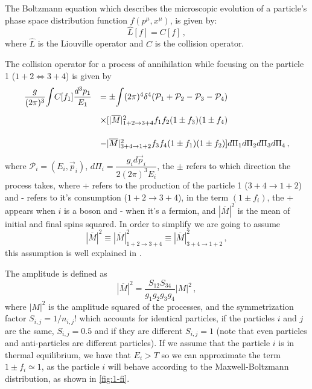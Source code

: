 The Boltzmann equation which describes the microscopic evolution of a particle's phase space distribution function $f(p^\mu,x^\mu)$, is given by:
\begin{equation}
	\hat{L}[f]=C[f]\,,
\end{equation}
where $\hat{L}$ is the Liouville operator and $C$ is the collision operator.


The collision operator for a process of annihilation while focusing on the particle 1 ($1 + 2 \Leftrightarrow 3 + 4$) is given by
\begin{align}
	\label{eqn:3.38}
	\begin{array}{lll}
		\dfrac{g}{(2\pi)^3}\mathlarger{\int} C[f_1]\dfrac{d^3p_1}{E_1}
		&=\pm \mathlarger{\int} (2\pi)^4 \delta^4(\mathcal{P}_1 + \mathcal{P}_2 - \mathcal{P}_3 - \mathcal{P}_4)\\[15pt]
		&\times[|\overline{M}|^2_{1 + 2 \rightarrow 3 + 4}f_1 f_2 (1\pm f_3)(1\pm f_4) \\ [15pt]
		&-|\overline{M}|^2_{3 + 4 \rightarrow 1 + 2}f_3 f_4 (1\pm f_1)(1\pm f_2) ] d\Pi_1 d\Pi_2 d\Pi_3 d\Pi_4\,,
	\end{array}
\end{align}
where $\mathcal{P}_i=(E_i,\vec{p}_i)$, $d\Pi_i=\dfrac{g_i d\vec{p}_i}{2(2\pi)^3E_i}$, the $\pm$ refers to which direction the process takes, where + refers to the production of the particle 1 ($3+4\rightarrow1+2$) and - refers to it's consumption ($1+2\rightarrow 3+4$), in the term $(1\pm f_i)$, the + appears when $i$ is a boson and - when it's a fermion, and $|\overline{M}|^2$ is the mean of initial and final spins squared.
In order to simplify we are going to assume
\begin{equation}
	|\overline{M}|^2 \equiv |\overline{M}|^2_{1+2\rightarrow 3+4} \equiv |\overline{M}|^2_{3+4\rightarrow 1+2} \,,
\end{equation}
this assumption is well explained in \cite{kolb}.

The amplitude is defined as
\begin{equation}
	|\overline{M}|^2=\frac{S_{12}S_{34}}{g_1g_2g_3g_4}|M|^2\,,
\end{equation} 
where $|M|^2$ is the amplitude squared of the processes, and the symmetrization factor $S_{i,j}=1/n_{i,j}!$ which accounts for identical particles, if the particles $i$ and $j$ are the same, $S_{i,j}=0.5$ and if they are different $S_{i,j}=1$ (note that even particles and anti-particles are different particles). 
If we assume that the particle $i$ is in thermal equilibrium, we have that $E_i>T$ so we can approximate the term $1 \pm f_i \simeq 1$, as the particle $i$ will behave according to the Maxwell-Boltzmann distribution, as shown in \autoref{fig:1-fi}.

